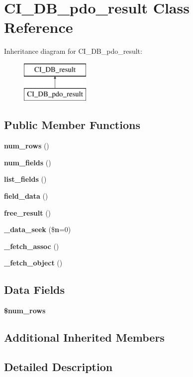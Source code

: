 \section{C\-I\-\_\-\-D\-B\-\_\-pdo\-\_\-result Class Reference}
\label{class_c_i___d_b__pdo__result}
Inheritance diagram for C\-I\-\_\-\-D\-B\-\_\-pdo\-\_\-result\-:\begin{figure}[H]
\begin{center}
\leavevmode
\includegraphics[height=2.000000cm]{class_c_i___d_b__pdo__result}
\end{center}
\end{figure}
\subsection*{Public Member Functions}
\begin{DoxyCompactItemize}
\item 
{\bf num\-\_\-rows} ()
\item 
{\bf num\-\_\-fields} ()
\item 
{\bf list\-\_\-fields} ()
\item 
{\bf field\-\_\-data} ()
\item 
{\bf free\-\_\-result} ()
\item 
{\bf \-\_\-data\-\_\-seek} (\${\bf n}=0)
\item 
{\bf \-\_\-fetch\-\_\-assoc} ()
\item 
{\bf \-\_\-fetch\-\_\-object} ()
\end{DoxyCompactItemize}
\subsection*{Data Fields}
\begin{DoxyCompactItemize}
\item 
{\bf \$num\-\_\-rows}
\end{DoxyCompactItemize}
\subsection*{Additional Inherited Members}


\subsection{Detailed Description}


